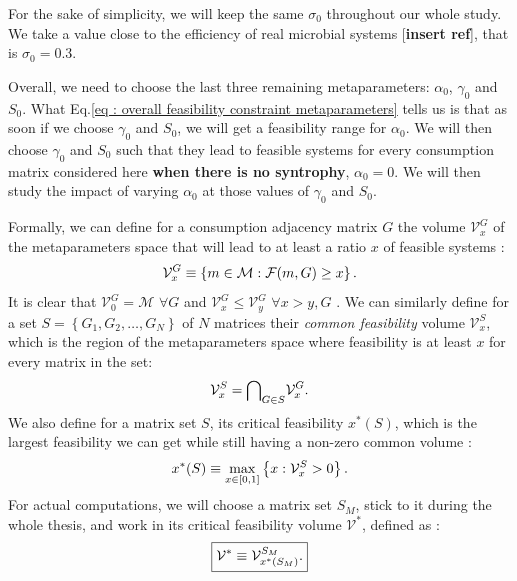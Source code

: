 \documentclass[12pt, titlepage]{report}
\begin{document}
For the sake of simplicity, we will keep the same $\sigma_0$ throughout our whole study. We take a value close to the efficiency of real microbial systems [\textbf{insert ref}], that is $\sigma_0 =0.3$.

Overall, we need to choose the last three remaining metaparameters: $\alpha_0$, $\gamma_0$ and $S_0$. What Eq.\eqref{eq : overall feasibility constraint metaparameters} tells us is that as soon if we choose $\gamma_0$ and $S_0$, we will get a feasibility range for $\alpha_0$.
We will then choose $\gamma_0$ and $S_0$ such that they lead to feasible systems for every consumption matrix considered here \textbf{when there is no syntrophy}, \ie $\alpha_0=0$. We will then study the impact of varying $\alpha_0$ at those values of $\gamma_0$ and $S_0$.

Formally, we can define for a consumption adjacency matrix $G$ the volume $\mathcal{V}^G_x$ of the metaparameters space that will lead to at least a ratio $x$ of feasible systems \ie :
\begin{equation}
\mathcal{V}^G_x \equiv \left\{m \in \mathcal{M} : \mathcal{F}(m, G)\geq x \right\}.
\end{equation}
It is clear that $\mathcal{V}^G_0 = \mathcal{M}$ $\forall G$ and $\mathcal{V}^G_{x} \leq \mathcal{V}^G_{y}$ $\forall x > y, G$ . We can similarly define for a set $S = \left\{ G_1, G_2, \dots, G_N\right\}$ of $N$ matrices their \textit{common feasibility} volume $\mathcal{V}^S_x$, which is the region of the metaparameters space where feasibility is at least $x$ for every matrix in the set:
\begin{equation}
\mathcal{V}^S_x = {\bigcap}_{G \in S} \mathcal{V}^G_x.
\end{equation}
We also define for a matrix set $S$, its critical feasibility $x^*(S)$, which is the largest feasibility we can get while still having a non-zero common volume :
\begin{equation}
x^*(S) \equiv \max_{x \in \left[0,1\right]}\left\{ x : \mathcal{V}^S_x > 0 \right\}.
\end{equation}
For actual computations, we will choose a matrix set $S_M$, stick to it during the whole thesis, and work in its critical feasibility volume $\mathcal{V}^*$, defined as :
\begin{equation}\boxed{
\mathcal{V}^* \equiv \mathcal{V}^{S_M}_{x^*(S_M)}.
}
\end{equation}
\end{document}
